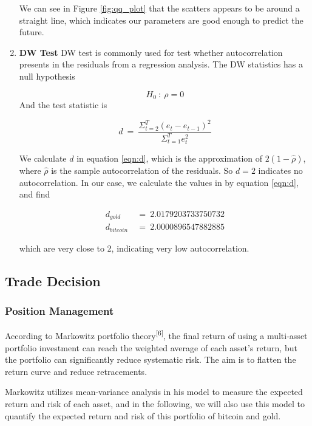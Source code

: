 \documentclass[12pt,a4paper]{article}
\begin{document}
\begin{spacing}{1.2}
\begin{enumerate}
	We can see in Figure \ref{fig:qq_plot} that the scatters appears to be around a straight line, which indicates our parameters are good enough to predict the future.
	
	\item \textbf{DW Test}
	DW test is commonly used for test whether autocorrelation presents in the residuals from a regression analysis. The DW statistics has a null hypothesis
	
$$
	H_0 \ : \ \rho = 0	
$$
	And the test statistic is
	
	\begin{equation}\label{eqn:d}
		d \ = \ \frac{\Sigma_{t=2}^T(e_t-e_{t-1})^2}{\Sigma_{t=1}^T e_t^2}
	\end{equation}

	We calculate $d$ in equation \ref{eqn:d}, which is the approximation of $2(1-\hat{\rho})$, where $\hat{\rho}$ is the sample autocorrelation of the residuals. So $d=2$ indicates no autocorrelation. In our case, we calculate the values in by equation \ref{eqn:d}, and find
	
\begin{align*}
	d_{gold} \ &= \ 2.0179203733750732 \\
	d_{bitcoin} \ &= \ 2.0000896547882885
\end{align*}

	which are very close to 2, indicating very low autocorrelation. 
\end{enumerate}

\subsection{Trade Decision}

\subsubsection{Position Management}
\label{sec:pos_management}

According to Markowitz portfolio theory\textsuperscript{[6]}, the final return of using a multi-asset portfolio investment can reach the weighted average of each asset's return, but the portfolio can significantly reduce systematic risk. The aim is to flatten the return curve and reduce retracements.

Markowitz utilizes mean-variance analysis in his model to measure the expected return and risk of each asset, and in the following, we will also use this model to quantify the expected return and risk of this portfolio of bitcoin and gold.


\end{spacing}
\end{document}
